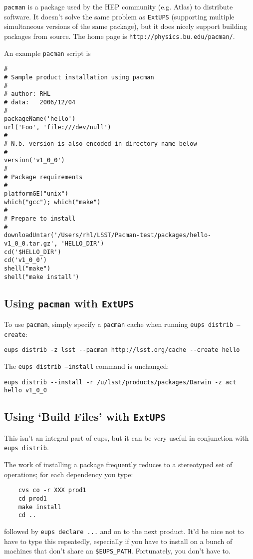 \documentclass{article}
\newcommand{\code}[1]{\texttt{#1}}
\newcommand{\eups}{\code{ExtUPS}}
\newcommand{\pacman}{\code{pacman}}
\begin{document}
\pacman{} is a package used by the HEP community (e.g. Atlas) to distribute
software.  It doesn't solve the same problem as \eups{} (supporting 
multiple simultaneous versions of the same package), but it does nicely
support building packages from source.  The home page is \code{http://physics.bu.edu/pacman/}.

An example \pacman{} script is
\begin{verbatim}
#
# Sample product installation using pacman
#
# author: RHL
# data:   2006/12/04
#
packageName('hello')
url('Foo', 'file:///dev/null')
#
# N.b. version is also encoded in directory name below
#
version('v1_0_0')
#
# Package requirements
#
platformGE("unix")
which("gcc"); which("make")
#
# Prepare to install
#
downloadUntar('/Users/rhl/LSST/Pacman-test/packages/hello-v1_0_0.tar.gz', 'HELLO_DIR')
cd('$HELLO_DIR')
cd('v1_0_0')
shell("make")
shell("make install")
\end{verbatim}				%

\subsection{Using \pacman{} with \eups{}}

To use \pacman{}, simply specify a \pacman{} cache when running \code{eups distrib --create}:
\begin{verbatim}
eups distrib -z lsst --pacman http://lsst.org/cache --create hello
\end{verbatim}

The \code{eups distrib --install} command is unchanged:
\begin{verbatim}
eups distrib --install -r /u/lsst/products/packages/Darwin -z act hello v1_0_0
\end{verbatim}

\subsection{Using `Build Files' with \eups{}}
\label{buildFiles}

This isn't an integral part of eups, but it can be very useful in conjunction with \code{eups distrib}.

The work of installing a package frequently reduces to a stereotyped set of operations;
for each dependency you type:
\begin{verbatim}
    cvs co -r XXX prod1
    cd prod1
    make install
    cd ..
\end{verbatim}
followed by \code{eups declare ...} and on to the next product.  It'd
be nice not to have to type this repeatedly, especially if you have to
install on a bunch of machines that don't share an
\code{\$EUPS\_PATH}.  Fortunately, you don't have to.
\end{document}
